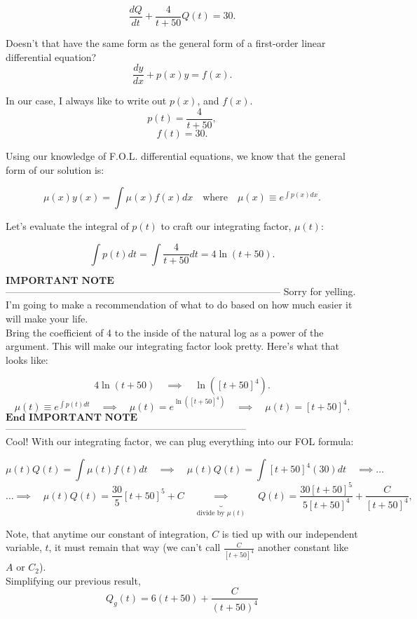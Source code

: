 \documentclass[a4paper,12pt]{article} %
\begin{document}
$$ \frac{dQ}{dt} + \frac{4}{t + 50}Q(t) = 30. $$

Doesn't that have the same form as the general form of a first-order linear differential equation?
$$ \frac{dy}{dx} + p(x)y = f(x). $$

In our case, I always like to write out $p(x)$, and $f(x)$.
$$ p(t) = \frac{4}{t + 50}, $$
$$ f(t) = 30. $$

Using our knowledge of F.O.L. differential equations, we know that the general form of our solution is:

$$ \mu(x)y(x) = \int \mu(x)f(x)dx \quad \text{where} \quad \mu(x) \equiv e^{\int p(x)dx}.
$$

Let's evaluate the integral of $p(t)$ to craft our integrating factor, $\mu(t)$:

$$ \int p(t)dt = \int \frac{4}{t + 50}dt = 4\ln{(t + 50)}. $$

$\boxed{\textbf{IMPORTANT NOTE}}$------------------------------------------------------------------------------------
Sorry for yelling. I'm going to make a recommendation of what to do based on how much easier it will make your life.\\

Bring the coefficient of 4 to the inside of the natural log as a power of the argument. This will make our integrating factor look pretty. Here's what that looks like:

$$  4\ln{(t + 50)} \quad\implies\quad \ln{([t + 50]^4)}. $$
$$\mu(t) \equiv e^{\int p(t)dt}\quad\implies\quad \mu(t) = e^{\ln{([t + 50]^4)}} \quad\implies\quad \mu(t) = [t+50]^4.
 $$
$\boxed{\textbf{End IMPORTANT NOTE}}$--------------------------------------------------------------------------\\

Cool! With our integrating factor, we can plug everything into our FOL formula:

$$ \mu(t) Q(t)=\int \mu(t) f(t) d t \quad\implies\quad \mu(t) Q(t)=\int[t+50]^4(30) d t \quad\implies\ldots
 $$
 $$ \ldots\implies\quad \mu(t) Q(t)=\frac{30}{5}[t+50]^5+C \quad \underbrace{\implies}_{\text{divide by $\mu(t)$}} \quad Q(t)=\frac{30[t+50]^5}{5[t+50]^4}+\frac{C}{[t+50]^4},
 $$
 
 Note, that anytime our constant of integration, $C$ is tied up with our independent variable, $t$, it must remain that way (we can't call $\frac{C}{[t+50]^4}$ another constant like $A$ or $C_2$).\\

Simplifying our previous result,
$$
\boxed{Q_g(t)=6(t+50)+\frac{C}{(t+50)^4}}
$$
\end{document}
